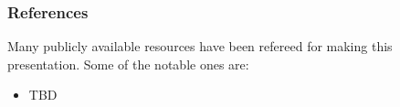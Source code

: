 \begin{frame}\frametitle{References}
Many publicly available resources have been refereed for making this presentation. Some of the notable ones are:
\footnotesize
\begin{itemize}
\item TBD
\end{itemize}
\end{frame}
